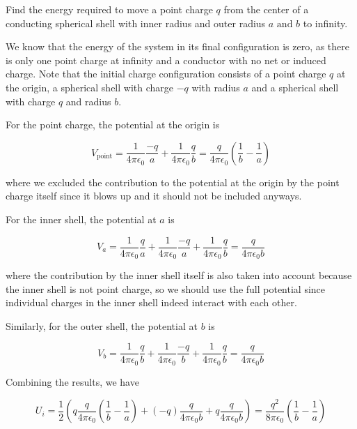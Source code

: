 \documentclass[english,a4paper,12pt]{report}
\begin{document}
{Find the energy required to move a point charge  \(q\) from the center of a conducting spherical shell with inner radius and outer radius \(a \text { and } b \) to infinity.}
{We know that the energy of the system in its final configuration is zero, as there is only one point charge at infinity and a conductor with no net or induced charge. Note that the initial charge configuration consists of a point charge \(q\) at the origin, a spherical shell with charge \(-q\) with radius \(a\) and a spherical shell with charge \(q\) and radius \(b\).
    
For the point charge, the potential at the origin is 

\begin{equation}
    V_{\text{point} } = \frac{1}{4\pi\epsilon_0} \frac{-q}{a} + \frac{1}{4\pi\epsilon_0} \frac{q}{b}  = \frac{q}{4\pi \epsilon_0} \left(\frac{1}{b} - \frac{1}{a} \right)
\end{equation}

where we excluded the contribution to the potential at the origin by the point charge itself since it blows up and it should not be included anyways.

For the inner shell, the potential at \(a\) is

\begin{equation}
    V_{a} = \frac{1}{4\pi\epsilon_0} \frac{q}{a} + \frac{1}{4\pi\epsilon_0} \frac{-q}{a}  + \frac{1}{4\pi\epsilon_0} \frac{q}{b} = \frac{q}{4\pi \epsilon_0 b} 
\end{equation}

where the contribution by the inner shell itself is also taken into account because the inner shell is not point charge, so we should use the full potential since individual charges in the inner shell indeed interact with each other.

Similarly, for the outer shell, the potential at \(b\) is

\begin{equation}
    V_{b} = \frac{1}{4\pi\epsilon_0} \frac{q}{b} + \frac{1}{4\pi\epsilon_0} \frac{-q}{b} + \frac{1}{4\pi\epsilon_0} \frac{q}{b}  = \frac{q}{4\pi \epsilon_0 b}   
\end{equation}

Combining the results, we have 

\begin{equation}
    U_{i} = \frac{1}{2} \left(q\frac{q}{4\pi \epsilon_0} \left(\frac{1}{b} - \frac{1}{a} \right) + (-q)\frac{q}{4\pi \epsilon_0 b} + q \frac{q}{4\pi \epsilon_0 b}\right) = \frac{q^2}{8\pi \epsilon_0} \left(\frac{1}{b} - \frac{1}{a} \right) 
\end{equation}

}
\end{document}
